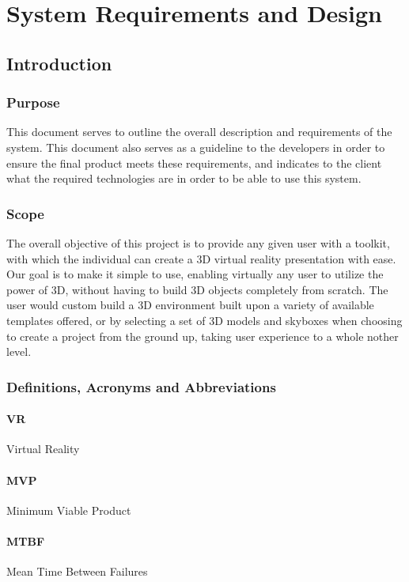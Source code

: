
\section{System Requirements and Design}

\subsection{Introduction}

	\subsubsection{Purpose}
	This document serves to outline the overall description and requirements of 	the system. This document also serves as a guideline to the developers in 		order to ensure the final product meets these requirements, and indicates 		to the client what the required technologies are in order to be able to use 	this system.

	\subsubsection{Scope}

	The overall objective of this project is to provide any given user with a toolkit, with which the individual can create a 3D virtual reality presentation with ease. Our goal is to make it simple to use, enabling virtually any user to utilize the power of 3D, without having to build 3D objects completely from scratch. The user would custom build a 3D environment built upon a variety of available templates offered, or by selecting a set of 3D models and skyboxes when choosing to create a project from the ground up, taking user experience to a whole nother level.

	\subsubsection{Definitions, Acronyms and Abbreviations}
			\paragraph{VR}	Virtual Reality
			\paragraph{MVP} Minimum Viable Product
			\paragraph{MTBF} Mean Time Between Failures
